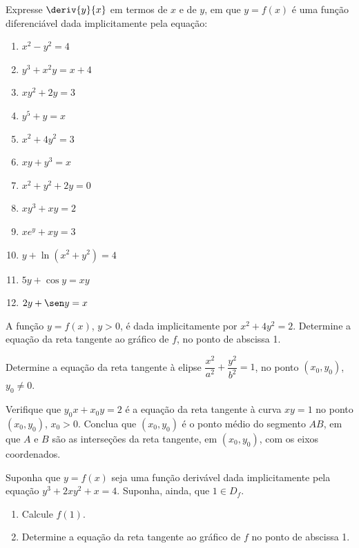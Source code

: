 \begin{exercicio}[4]
Expresse $\deriv{y}{x}$ em termos de $x$ e de $y$, em que $y = f(x)$ é uma função diferenciável dada implicitamente pela equação:
\begin{enumerate}[label=\alph*)]
    \item $x^2 - y^2 = 4$
    \item $y^3 + x^2 y = x + 4$
    \item $xy^2 + 2y = 3$
    \item $y^5 + y = x$
    \item $x^2 + 4y^2 = 3$
    \item $xy + y^3 = x$
    \item $x^2 + y^2 + 2y = 0$
    \item $xy^3 + xy = 2$
    \item $xe^y + xy = 3$
    \item $y + \ln(x^2 + y^2) = 4$
    \item $5y + \cos y = xy$
    \item $2y + \sen y = x$
\end{enumerate}
\end{exercicio}

\begin{exercicio}[5]
A função $y = f(x)$, $y > 0$, é dada implicitamente por $x^2 + 4y^2 = 2$. Determine a equação da reta tangente ao gráfico de $f$, no ponto de abscissa 1.
\end{exercicio}

\begin{exercicio}[6]
Determine a equação da reta tangente à elipse $\dfrac{x^2}{a^2} + \dfrac{y^2}{b^2} = 1$, no ponto $(x_0, y_0)$, $y_0 \neq 0$.
\end{exercicio}

\begin{exercicio}[7]
Verifique que $y_0 x + x_0 y = 2$ é a equação da reta tangente à curva $xy = 1$ no ponto $(x_0, y_0)$, $x_0 > 0$. Conclua que $(x_0, y_0)$ é o ponto médio do segmento $AB$, em que $A$ e $B$ são as interseções da reta tangente, em $(x_0, y_0)$, com os eixos coordenados.
\end{exercicio}

\begin{exercicio}[8]
Suponha que $y = f(x)$ seja uma função derivável dada implicitamente pela equação $y^3 + 2xy^2 + x = 4$. Suponha, ainda, que $1 \in D_f$.
\begin{enumerate}[label=\alph*)]
    \item Calcule $f(1)$.
    \item Determine a equação da reta tangente ao gráfico de $f$ no ponto de abscissa 1.
\end{enumerate}
\end{exercicio}

